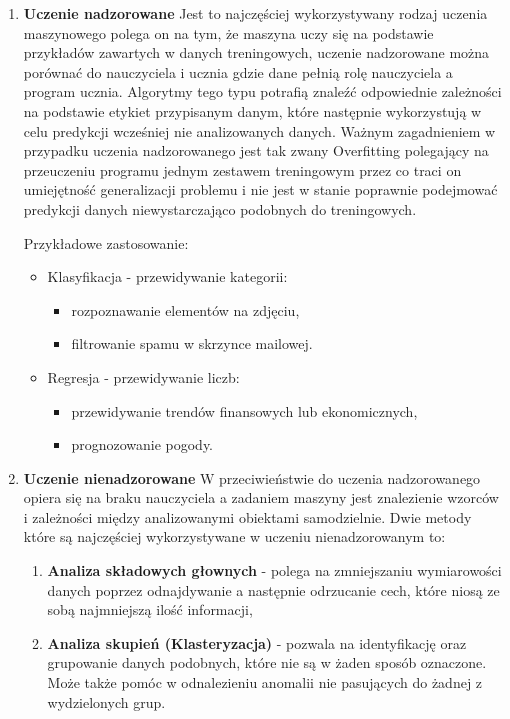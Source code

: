 \begin{enumerate}
    \item \textbf{Uczenie nadzorowane}
    Jest to najczęściej wykorzystywany rodzaj uczenia maszynowego polega on na tym,
    że maszyna uczy się na podstawie przykładów zawartych w danych treningowych,
    uczenie nadzorowane można porównać do nauczyciela i ucznia gdzie dane pełnią rolę nauczyciela 
    a program ucznia. Algorytmy tego typu potrafią znaleźć odpowiednie zależności na podstawie
    etykiet przypisanym danym,
    które następnie wykorzystują w celu predykcji wcześniej nie analizowanych danych.
    Ważnym zagadnieniem w przypadku uczenia nadzorowanego jest tak zwany Overfitting polegający 
    na przeuczeniu programu jednym zestawem treningowym przez co traci on umiejętność generalizacji problemu
    i nie jest w stanie poprawnie podejmować predykcji danych niewystarczająco podobnych
    do treningowych.

    Przykładowe zastosowanie:
    \begin{itemize}
        \item Klasyfikacja - przewidywanie kategorii:
        \begin{itemize}
            \item rozpoznawanie elementów na zdjęciu,
            \item filtrowanie spamu w skrzynce mailowej.
        \end{itemize}
        \item Regresja - przewidywanie liczb:
        \begin{itemize}
            \item przewidywanie trendów finansowych lub ekonomicznych,
            \item prognozowanie pogody.
        \end{itemize}
    \end{itemize}
    \item \textbf{Uczenie nienadzorowane}
    W przeciwieństwie do uczenia nadzorowanego opiera się na braku
    nauczyciela a zadaniem maszyny jest znalezienie wzorców i zależności między analizowanymi
    obiektami samodzielnie. Dwie metody które są najczęściej wykorzystywane w uczeniu nienadzorowanym
    to:
    \begin{enumerate}
        \item \textbf{Analiza składowych głownych} - polega na zmniejszaniu wymiarowości danych poprzez
        odnajdywanie a następnie odrzucanie cech, które niosą ze sobą najmniejszą ilość informacji,
        \item \textbf{Analiza skupień (Klasteryzacja)} - pozwala na identyfikację oraz grupowanie danych
        podobnych, które nie są w żaden sposób oznaczone. Może także pomóc w odnalezieniu anomalii
        nie pasujących do żadnej z wydzielonych grup.
        

\end{enumerate}
\end{enumerate}
